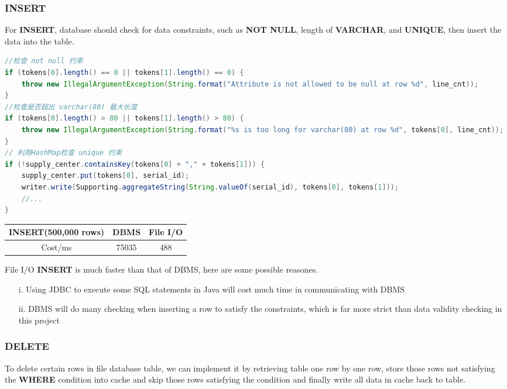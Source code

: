 \documentclass[onecolumn, oneside, ctexart, UTF8, b4paper]{SUSTechHomework}
\begin{document}
\subsubsection{\textbf{INSERT}}
For \textbf{INSERT}, database should check for data constraints, such as \textbf{NOT NULL}, length of \textbf{VARCHAR}, and \textbf{UNIQUE}, then insert the data into the table.
\begin{lstlisting}[language=Java]
//检查 not null 约束
if (tokens[0].length() == 0 || tokens[1].length() == 0) {
    throw new IllegalArgumentException(String.format("Attribute is not allowed to be null at row %d", line_cnt));
}
//检查是否超出 varchar(80) 最大长度
if (tokens[0].length() > 80 || tokens[1].length() > 80) {
    throw new IllegalArgumentException(String.format("%s is too long for varchar(80) at row %d", tokens[0], line_cnt));
}
// 利用HashMap检查 unique 约束
if (!supply_center.containsKey(tokens[0] + "," + tokens[1])) {
    supply_center.put(tokens[0], serial_id);
    writer.write(Supporting.aggregateString(String.valueOf(serial_id), tokens[0], tokens[1]));
    //...
}
\end{lstlisting}

\begin{center}
\begin{tabular}{|c|c|c|}
     \hline
     INSERT(500,000 rows) & DBMS & File I/O \\
    \hline
    Cost/ms & 75035 & 488 \\
    \hline
\end{tabular}
\end{center}

File I/O \textbf{INSERT} is much faster than that of DBMS, here are some possible reasones.
\begin{enumerate}
    \item [i.]
    Using JDBC to execute some SQL statements in Java will cost much time in communicating with DBMS
    \item [ii.]
    DBMS will do many checking when inserting a row to satisfy the constraints, which is far more strict than data validity checking in this project
\end{enumerate}

\subsubsection{\textbf{DELETE}}
To delete certain rows in file database table, we can implement it by retrieving table one row by one row, store those rows not satisfying the \textbf{WHERE} condition into cache and skip those rows satisfying the condition and finally write all data in cache back to table.
\end{document}
